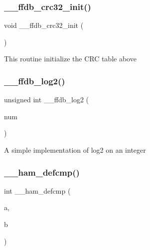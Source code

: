\subsubsection{\texorpdfstring{\_\_ffdb\_crc32\_init()}{\_\_ffdb\_crc32\_init()}}
{\footnotesize\ttfamily void \+\_\+\+\_\+ffdb\+\_\+crc32\+\_\+init (\begin{DoxyParamCaption}\item[{void}]{ }\end{DoxyParamCaption})}

This routine initialize the C\+RC table above \mbox{\label{adat-devel_2other__libs_2filedb_2filehash_2ffdb__hash__func_8h_a79d8cb8240ebb32c74ba51a0eac8aa64}} 
\subsubsection{\texorpdfstring{\_\_ffdb\_log2()}{\_\_ffdb\_log2()}}
{\footnotesize\ttfamily unsigned int \+\_\+\+\_\+ffdb\+\_\+log2 (\begin{DoxyParamCaption}\item[{unsigned int}]{num }\end{DoxyParamCaption})}

A simple implementation of log2 on an integer \mbox{\label{adat-devel_2other__libs_2filedb_2filehash_2ffdb__hash__func_8h_a84933d22e6744fb559a08e95010872e6}} 
\subsubsection{\texorpdfstring{\_\_ham\_defcmp()}{\_\_ham\_defcmp()}}
{\footnotesize\ttfamily int \+\_\+\+\_\+ham\+\_\+defcmp (\begin{DoxyParamCaption}\item[{const \mbox{\hyperlink{adat-devel_2other__libs_2filedb_2filehash_2ffdb__db_8h_aa2e0984399491df0fdd20898ca8758f9}{F\+F\+D\+B\+\_\+\+D\+BT}} $\ast$}]{a,  }\item[{const \mbox{\hyperlink{adat-devel_2other__libs_2filedb_2filehash_2ffdb__db_8h_aa2e0984399491df0fdd20898ca8758f9}{F\+F\+D\+B\+\_\+\+D\+BT}} $\ast$}]{b }\end{DoxyParamCaption})}

